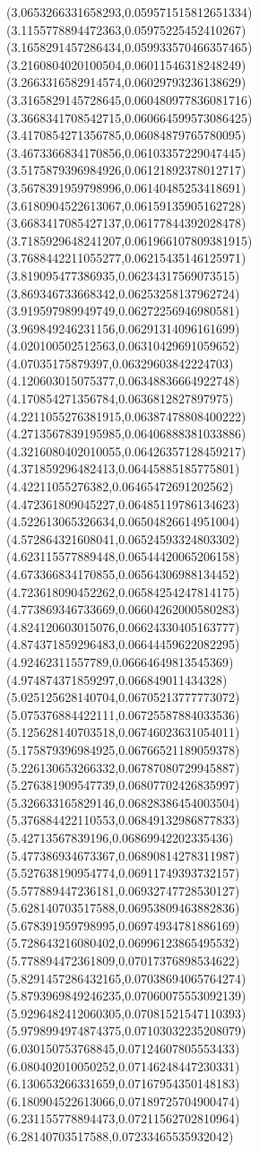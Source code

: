 {(3.0653266331658293,0.059571515812651334)
(3.1155778894472363,0.05975225452410267)
(3.1658291457286434,0.059933570466357465)
(3.2160804020100504,0.06011546318248249)
(3.2663316582914574,0.06029793236138629)
(3.3165829145728645,0.060480977836081716)
(3.3668341708542715,0.060664599573086425)
(3.4170854271356785,0.06084879765780095)
(3.4673366834170856,0.06103357229047445)
(3.5175879396984926,0.06121892378012717)
(3.5678391959798996,0.06140485253418691)
(3.6180904522613067,0.06159135905162728)
(3.6683417085427137,0.06177844392028478)
(3.7185929648241207,0.061966107809381915)
(3.7688442211055277,0.06215435146125971)
(3.819095477386935,0.06234317569073515)
(3.869346733668342,0.06253258137962724)
(3.919597989949749,0.06272256946980581)
(3.969849246231156,0.06291314096161699)
(4.020100502512563,0.06310429691059652)
(4.07035175879397,0.06329603842224703)
(4.120603015075377,0.06348836664922748)
(4.170854271356784,0.0636812827897975)
(4.2211055276381915,0.06387478808400222)
(4.2713567839195985,0.06406888381033886)
(4.3216080402010055,0.06426357128459217)
(4.371859296482413,0.06445885185775801)
(4.42211055276382,0.06465472691202562)
(4.472361809045227,0.06485119786134623)
(4.522613065326634,0.06504826614951004)
(4.572864321608041,0.06524593324803302)
(4.623115577889448,0.06544420065206158)
(4.673366834170855,0.06564306988134452)
(4.723618090452262,0.06584254247814175)
(4.773869346733669,0.06604262000580283)
(4.824120603015076,0.06624330405163777)
(4.874371859296483,0.06644459622082295)
(4.92462311557789,0.06664649813545369)
(4.974874371859297,0.066849011434328)
(5.025125628140704,0.06705213777773072)
(5.075376884422111,0.06725587884033536)
(5.125628140703518,0.06746023631054011)
(5.175879396984925,0.06766521189059378)
(5.226130653266332,0.06787080729945887)
(5.276381909547739,0.06807702426835997)
(5.326633165829146,0.06828386454003504)
(5.376884422110553,0.06849132986877833)
(5.42713567839196,0.06869942202335436)
(5.477386934673367,0.06890814278311987)
(5.527638190954774,0.06911749393732157)
(5.577889447236181,0.06932747728530127)
(5.628140703517588,0.06953809463882836)
(5.678391959798995,0.06974934781886169)
(5.728643216080402,0.06996123865495532)
(5.778894472361809,0.07017376898534622)
(5.8291457286432165,0.07038694065764274)
(5.8793969849246235,0.07060075553092139)
(5.9296482412060305,0.07081521547110393)
(5.9798994974874375,0.07103032235208079)
(6.030150753768845,0.07124607805553433)
(6.080402010050252,0.07146248447230331)
(6.130653266331659,0.07167954350148183)
(6.180904522613066,0.07189725704900474)
(6.231155778894473,0.07211562702810964)
(6.28140703517588,0.07233465535932042)
}
